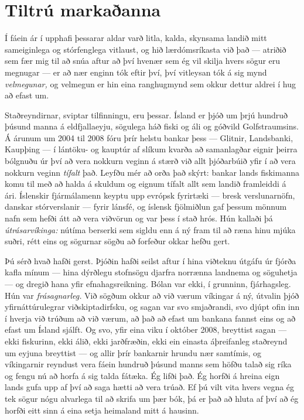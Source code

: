 \chapter{Tiltrú markaðanna}

Í fáein ár í upphafi þessarar aldar varð litla, kalda, skynsama landið mitt sameiginlega og stórfenglega vitlaust, og hið lærdómsríkasta við það — atriðið sem fær mig til að snúa aftur að því hvenær sem ég vil skilja hvers sögur eru megnugar — er að nær enginn tók eftir því, því vitleysan tók á sig mynd \emph{velmegunar,} og velmegun er hin eina ranghugmynd sem okkur dettur aldrei í hug að efast um.

Staðreyndirnar, sviptar tilfinningu, eru þessar. Ísland er þjóð um þrjú hundruð þúsund manna á eldfjallaeyju, sögulega háð fiski og áli og góðvild Golfstraumsins. Á árunum um 2004 til 2008 fóru þrír helstu bankar þess — Glitnir, Landsbanki, Kaupþing — í lántöku- og kauptúr af slíkum kvarða að samanlagðar eignir þeirra bólgnuðu úr því að vera nokkurn veginn á stærð við allt þjóðarbúið yfir í að vera nokkurn veginn \emph{tífalt} það. Leyfðu mér að orða það skýrt: bankar lands fiskimanna komu til með að halda á skuldum og eignum tífalt allt sem landið framleiddi á ári. Íslenskir fjármálamenn keyptu upp evrópsk fyrirtæki — bresk verslunarnöfn, danskar stórverslanir — fyrir lánsfé, og íslensk fjölmiðlun gaf þessum mönnum nafn sem hefði átt að vera viðvörun og var þess í stað hrós. Hún kallaði þá \emph{útrásarvíkinga:} nútíma berserki sem sigldu enn á ný fram til að ræna hinu mjúka suðri, rétt eins og sögurnar sögðu að forfeður okkar hefðu gert.

Þú sérð hvað hafði gerst. Þjóðin hafði seilst aftur í hina viðteknu útgáfu úr fjórða kafla mínum — hina dýrðlegu stofnsögu djarfra norrænna landnema og söguhetja — og dregið hana yfir efnahagsreikning. Bólan var ekki, í grunninn, fjárhagsleg. Hún var \emph{frásagnarleg.} Við sögðum okkur að við værum víkingar á ný, útvalin þjóð yfirnáttúrulegrar viðskiptadirfsku, og sagan var svo smjaðrandi, svo djúpt ofin inn í hverja við trúðum að við værum, að það að efast um bankana fannst eins og að efast um Ísland sjálft. Og svo, yfir eina viku í október 2008, breyttist sagan — ekki fiskurinn, ekki álið, ekki jarðfræðin, ekki ein einasta áþreifanleg staðreynd um eyjuna breyttist — og allir þrír bankarnir hrundu nær samtímis, og víkingarnir reyndust vera fáein hundruð þúsund manns sem höfðu talað sig ríka og fengu nú að horfa á sig talda fátæka. Ég lifði það. Ég horfði á hreina eign lands gufa upp af því að saga hætti að vera trúað. Ef þú vilt vita hvers vegna ég tek sögur nógu alvarlega til að skrifa um þær bók, þá er það að hluta af því að ég horfði eitt sinn á eina setja heimaland mitt á hausinn.

